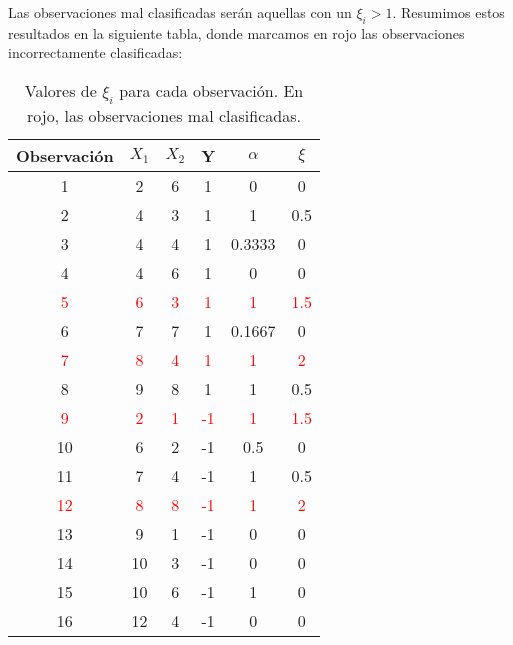 \begin{example}
Las observaciones mal clasificadas serán aquellas con un $\xi_i > 1$. Resumimos estos resultados en la siguiente tabla, donde marcamos en rojo las observaciones incorrectamente clasificadas:
\begin{table}[H]
\centering
\begin{tabular}{cccccc}
\toprule
Observación & $X_1$ & $X_2$ & Y & $\alpha$ & $\xi$ \\
\toprule
1 & 2 & 6 & 1 & 0 & 0 \\
2 & 4 & 3 & 1 & 1 & 0.5 \\
3 & 4 & 4 & 1 & 0.3333 & 0 \\
4 & 4 & 6 & 1 & 0 & 0 \\
\textcolor{red}{5} & \textcolor{red}{6} & \textcolor{red}{3} & \textcolor{red}{1} & \textcolor{red}{1} & \textcolor{red}{1.5} \\
6 & 7 & 7 & 1 & 0.1667 & 0 \\
\textcolor{red}{7} & \textcolor{red}{8} & \textcolor{red}{4} & \textcolor{red}{1} & \textcolor{red}{1} & \textcolor{red}{2} \\
8 & 9 & 8 & 1 & 1 & 0.5 \\
\textcolor{red}{9} & \textcolor{red}{2} & \textcolor{red}{1} & \textcolor{red}{-1} & \textcolor{red}{1} & \textcolor{red}{1.5} \\
10 & 6 & 2 & -1 & 0.5 & 0 \\
11 & 7 & 4 & -1 & 1 & 0.5 \\
\textcolor{red}{12} & \textcolor{red}{8} & \textcolor{red}{8} & \textcolor{red}{-1} & \textcolor{red}{1} & \textcolor{red}{2} \\
13 & 9 & 1 & -1 & 0 & 0 \\
14 & 10 & 3 & -1 & 0 & 0 \\
15 & 10 & 6 & -1 & 1 & 0 \\
16 & 12 & 4 & -1 & 0 & 0 \\
\toprule
\end{tabular}
\caption{Valores de $\xi_i$ para cada observación. En rojo, las observaciones mal clasificadas.}
\label{tab:2}
\end{table}

\end{example}